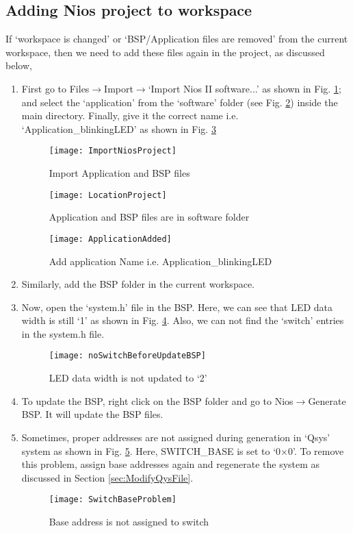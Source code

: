 \subsection{Adding Nios project to workspace}
If `workspace is changed' or `BSP/Application files are removed' from the current workspace, then we need to add these files again in the project, as discussed below, 
\begin{enumerate}
	\item First go to Files$\rightarrow$Import$\rightarrow$`Import Nios II software...' as shown in Fig. \ref{fig:ImportNiosProject}; and select the `application' from the `software' folder (see Fig. \ref{fig:LocationProject}) inside the main directory. Finally, give it the correct name i.e. `Application\_blinkingLED' as shown in Fig. \ref{fig:ApplicationAdded}
	\begin{figure}[!h]
		\centering
		\texttt{[image: ImportNiosProject]}
		\caption{Import Application and BSP files}
		\label{fig:ImportNiosProject}
	\end{figure}
	\begin{figure}[!h]
		\centering
		\texttt{[image: LocationProject]}
		\caption{Application and BSP files are in software folder}
		\label{fig:LocationProject}
	\end{figure}
	\begin{figure}[!h]
		\centering
		\texttt{[image: ApplicationAdded]}
		\caption{Add application Name i.e. Application\_blinkingLED}
		\label{fig:ApplicationAdded}
	\end{figure}
	\item Similarly, add the BSP folder in the current workspace. 
	\item Now, open the `system.h' file in the BSP. Here, we can see that LED data width is still `1' as shown in Fig. \ref{fig:noSwitchBeforeUpdateBSP}. Also, we can not find the `switch' entries in the system.h file. 
	\begin{figure}[!h]
		\centering
		\texttt{[image: noSwitchBeforeUpdateBSP]}
		\caption{LED data width is not updated to `2'}
		\label{fig:noSwitchBeforeUpdateBSP}
	\end{figure}
	\item To update the BSP, right click on the BSP folder and go to Nios$\rightarrow$Generate BSP. It will update the BSP files.
	\item Sometimes, proper addresses are not assigned during generation in `Qsys' system as shown in Fig. \ref{fig:SwitchBaseProblem}. Here, SWITCH\_BASE is set to `0$\times$0'. To remove this problem, assign base addresses again and regenerate the system as discussed in Section \ref{sec:ModifyQysFile}. 
	\begin{figure}[!h]
		\centering
		\texttt{[image: SwitchBaseProblem]}
		\caption{Base address is not assigned to switch}
		\label{fig:SwitchBaseProblem}
	\end{figure}	
\end{enumerate} 

